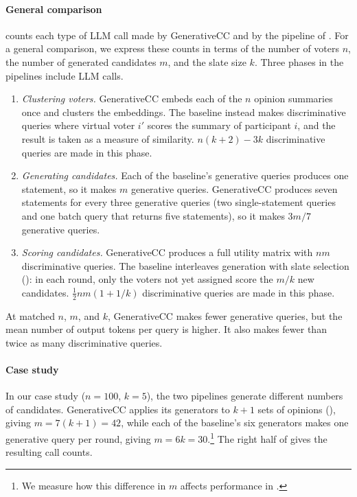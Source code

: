 \documentclass[letterpaper]{article} %
\begin{document}
\paragraph{General comparison}
 counts each type of LLM call made by GenerativeCC and by the pipeline of \citet{fish-v2}.
For a general comparison, we express these counts in terms of the number of voters \(n\), the number of generated candidates \(m\), and the slate size \(k\).
Three phases in the pipelines include LLM calls.
\begin{enumerate}
    \item \emph{Clustering voters.}
    GenerativeCC embeds each of the \(n\) opinion summaries once and clusters the embeddings.
    The baseline instead makes discriminative queries where virtual voter \(i'\) scores the summary of participant \(i\), and the result is taken as a measure of similarity.
    \(n(k+2)-3k\) discriminative queries are made in this phase.
    \item \emph{Generating candidates.}
    Each of the baseline's generative queries produces one statement, so it makes \(m\) generative queries.
    GenerativeCC produces seven statements for every three generative queries (two single-statement queries and one batch query that returns five statements), so it makes \(3m/7\) generative queries.
    \item \emph{Scoring candidates.}
    GenerativeCC produces a full utility matrix with \(nm\) discriminative queries.
    The baseline interleaves generation with slate selection (): in each round, only the voters not yet assigned score the \(m/k\) new candidates.
    \(\frac{1}{2} n m (1 + 1/k)\) discriminative queries are made in this phase.
\end{enumerate}

At matched \(n\), \(m\), and \(k\), GenerativeCC makes fewer generative queries, but the mean number of output tokens per query is higher.
It also makes fewer than twice as many discriminative queries.

\paragraph{Case study}
In our case study (\(n=100\), \(k=5\)), the two pipelines generate different numbers of candidates.
GenerativeCC applies its generators to \(k+1\) sets of opinions (), giving \(m=7(k+1)=42\), while each of the baseline's six generators makes one generative query per round, giving \(m=6k=30\).\footnote{We measure how this difference in \(m\) affects performance in .}
The right half of  gives the resulting call counts.
\end{document}
